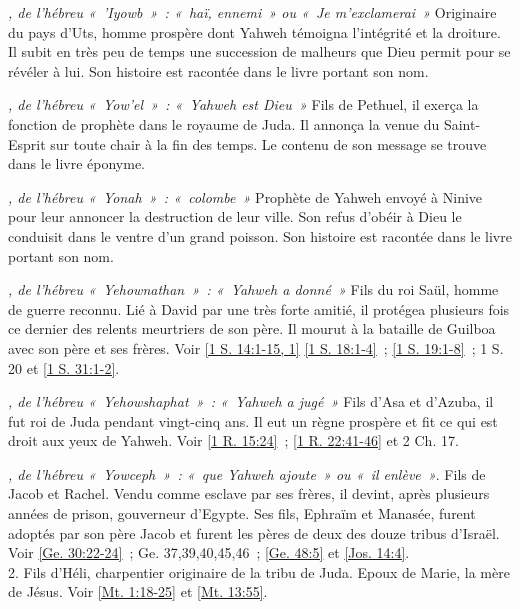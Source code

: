 \begin{multicols}{2}
\textit{, de l'hébreu «~'Iyowb~»~: «~haï, ennemi~» ou «~Je m'exclamerai~»}\newline
Originaire du pays d'Uts, homme prospère dont Yahweh témoigna l'intégrité et la droiture. Il subit en très peu de temps une succession de malheurs que Dieu permit pour se révéler à lui. Son histoire est racontée dans le livre portant son nom.

\textit{, de l'hébreu «~Yow'el~»~: «~Yahweh est Dieu~»}\newline
Fils de Pethuel, il exerça la fonction de prophète dans le royaume de Juda. Il annonça la venue du Saint-Esprit sur toute chair à la fin des temps. Le contenu de son message se trouve dans le livre éponyme.

\textit{, de l'hébreu «~Yonah~»~: «~colombe~»}\newline
Prophète de Yahweh envoyé à Ninive pour leur annoncer la destruction de leur ville. Son refus d'obéir à Dieu le conduisit dans le ventre d'un grand poisson. Son histoire est racontée dans le livre portant son nom.

\textit{, de l'hébreu «~Yehownathan~»~: «~Yahweh a donné~»}\newline
Fils du roi Saül, homme de guerre reconnu. Lié à David par une très forte amitié, il protégea plusieurs fois ce dernier des relents meurtriers de son père. Il mourut à la bataille de Guilboa avec son père et ses frères. Voir \vref{1 S. 14:1-15, 1} \vref{1 S. 18:1-4}~; \vref{1 S. 19:1-8}~; 1 S. 20 et \vref{1 S. 31:1-2}.

\textit{, de l'hébreu «~Yehowshaphat~»~: «~Yahweh a jugé~»}\newline
Fils d'Asa et d'Azuba, il fut roi de Juda pendant vingt-cinq ans. Il eut un règne prospère et fit ce qui est droit aux yeux de Yahweh. Voir \vref{1 R. 15:24}~; \vref{1 R. 22:41-46} et 2 Ch. 17.

\textit{, de l'hébreu «~Yowceph~»~: «~que Yahweh ajoute~» ou «~il enlève~»}. Fils de Jacob et Rachel. Vendu comme esclave par ses frères, il devint, après plusieurs années de prison, gouverneur d'Egypte. Ses fils, Ephraïm et Manasée, furent adoptés par son père Jacob et furent les pères de deux des douze tribus d'Israël. Voir \vref{Ge. 30:22-24}~; Ge. 37,39,40,45,46~; \vref{Ge. 48:5} et \vref{Jos. 14:4}.
\\2. Fils d'Héli, charpentier originaire de la tribu de Juda. Epoux de Marie, la mère de Jésus. Voir \vref{Mt. 1:18-25} et \vref{Mt. 13:55}.


\end{multicols}
